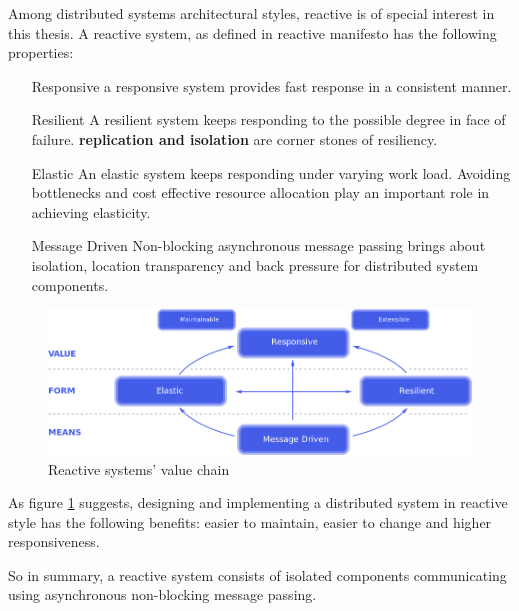 \documentclass[a4]{report}
\begin{document}
        Among distributed systems architectural styles, reactive is of special interest in this thesis.
        A reactive system, as defined in reactive manifesto \cite{reactive-manifesto} has the following properties:
        \begin{itemize}
            \item[Responsive] a responsive system provides fast response in a consistent manner.
            \item[Resilient] A resilient system keeps responding to the possible degree in face of failure.
            \textbf{replication and isolation} are corner stones of resiliency.
            \item[Elastic] An elastic system keeps responding under varying work load. Avoiding bottlenecks and cost
            effective resource allocation play an important role in achieving elasticity.
            \item[Message Driven] Non-blocking asynchronous message passing brings about isolation, location
            transparency and back pressure for distributed system components.
        \end{itemize}

        \begin{figure}[ht]
            \caption{Reactive systems' value chain}
            \label{fig:reactive-value}
            \includegraphics[scale=0.4]{images/reactive-traits.png}
        \end{figure}


        As figure \ref{fig:reactive-value} suggests, designing and implementing a distributed system in reactive style
        has the following benefits: easier to maintain, easier to change and higher responsiveness.

        So in summary, a reactive system consists of isolated components communicating using asynchronous non-blocking message passing.
\end{document}
